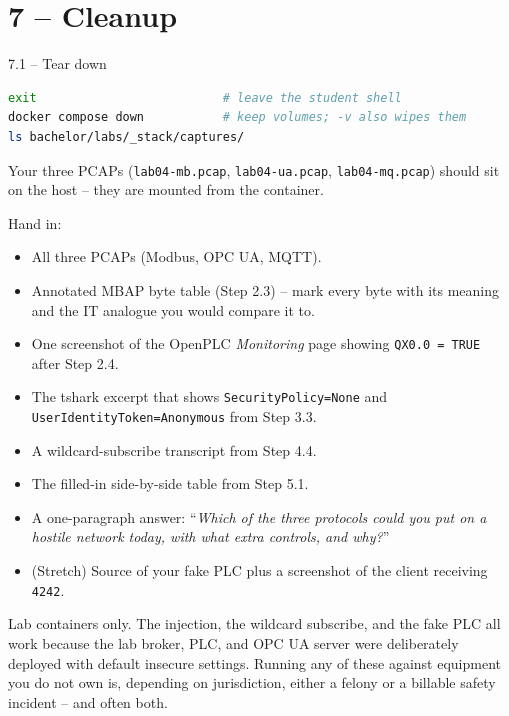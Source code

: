 \documentclass[11pt,a4paper]{article}
\begin{document}
\section*{7 -- Cleanup}

\begin{stepbox}{7.1 -- Tear down}
\begin{lstlisting}[language=bash]
exit                          # leave the student shell
docker compose down           # keep volumes; -v also wipes them
ls bachelor/labs/_stack/captures/
\end{lstlisting}
Your three PCAPs (\texttt{lab04-mb.pcap}, \texttt{lab04-ua.pcap},
\texttt{lab04-mq.pcap}) should sit on the host -- they are mounted from
the container.
\end{stepbox}

\begin{deliverbox}
Hand in:
\begin{itemize}[leftmargin=*, nosep]
  \item All three PCAPs (Modbus, OPC UA, MQTT).
  \item Annotated MBAP byte table (Step 2.3) -- mark every byte with its
        meaning and the IT analogue you would compare it to.
  \item One screenshot of the OpenPLC \emph{Monitoring} page showing
        \texttt{QX0.0 = TRUE} after Step 2.4.
  \item The tshark excerpt that shows \texttt{SecurityPolicy=None} and
        \texttt{UserIdentityToken=Anonymous} from Step 3.3.
  \item A wildcard-subscribe transcript from Step 4.4.
  \item The filled-in side-by-side table from Step 5.1.
  \item A one-paragraph answer: ``\emph{Which of the three protocols
        could you put on a hostile network today, with what extra
        controls, and why?}''
  \item (Stretch) Source of your fake PLC plus a screenshot of the
        client receiving \texttt{4242}.
\end{itemize}
\end{deliverbox}

\begin{warnbox}
Lab containers only. The injection, the wildcard subscribe, and the
fake PLC all work because the lab broker, PLC, and OPC UA server were
deliberately deployed with default insecure settings. Running any of
these against equipment you do not own is, depending on jurisdiction,
either a felony or a billable safety incident -- and often both.
\end{warnbox}
\end{document}
